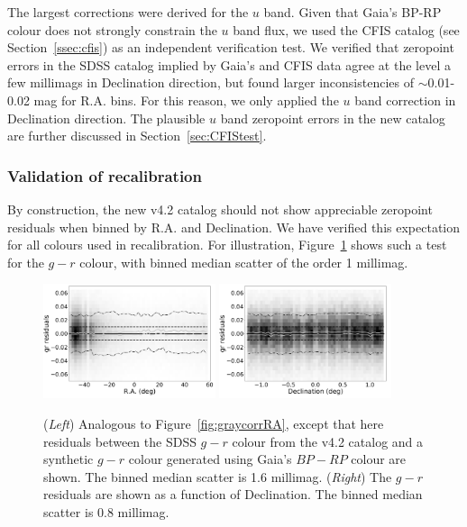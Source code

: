 \documentclass[fleqn,usenatbib]{mnras}
\begin{document}
The largest corrections were derived for the $u$ band. Given that Gaia's BP-RP
colour does not strongly constrain the $u$ band flux, we used the CFIS catalog 
(see Section~\ref{ssec:cfis}) as an independent verification test. We verified that
zeropoint errors in the SDSS catalog implied by Gaia's and CFIS data agree at the
level a few millimags in Declination direction, but found larger inconsistencies of $\sim$0.01-0.02 mag
 for R.A. bins. For this reason, we only applied the $u$ band 
correction in Declination direction. The plausible $u$ band zeropoint errors in 
the new catalog are further discussed in Section~\ref{sec:CFIStest}. %




\subsubsection{Validation of recalibration  \label{sec:SSCvsGaia}} 
  
By construction, the new v4.2 catalog should not show appreciable zeropoint residuals when 
binned by R.A. and Declination. We have verified this expectation for all colours used in 
recalibration. For illustration, Figure~\ref{fig:grVSgaiaRADec} shows such a test for the $g-r$ 
colour, with binned median scatter of the order 1 millimag. 

\begin{figure}
    \centering\includegraphics[width=0.45\textwidth]{figures/colorResidGaiaColors_gr_RA_Hess.png} 
    \centering\includegraphics[width=0.45\textwidth]{figures/colorResidGaiaColors_gr_Dec_Hess.png} 
\caption{({\it Left}) Analogous to Figure~\ref{fig:graycorrRA}, except that here residuals between
the SDSS $g-r$ colour from the v4.2 catalog and a synthetic $g-r$ colour generated using 
Gaia's $BP-RP$ colour are shown. The binned median scatter is 1.6 millimag. ({\it Right}) The 
$g-r$ residuals are shown as a function of Declination. The binned median scatter is 
0.8 millimag.}
\label{fig:grVSgaiaRADec}
\end{figure}
 
\end{document}
